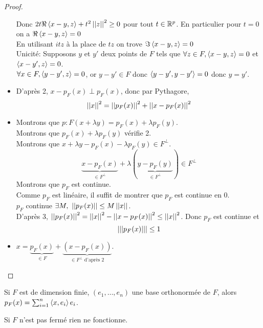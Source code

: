 \begin{proof}
\begin{itemize}
		      Donc $2t\Re \left\langle x - y, z \right\rangle + t^2 \left|\left|z\right|\right|^2 \geq 0$ pour tout $t \in \mathbb{R}^p$.
		      En particulier pour $t = 0$ on a $\Re \left\langle x - y, z \right\rangle = 0$ \\
		      En utilisant $itz$ à la place de $tz$ on trove $\Im \left\langle x - y, z \right\rangle = 0$\\

		      Unicité: Supposons $y$ et $y'$ deux points de $F$ tels que $\forall z \in F, \left\langle x - y, z \right\rangle = 0$ et $\left\langle x - y', z \right\rangle = 0$.\\
		      $\forall x \in F, \left\langle y - y', z \right\rangle = 0$, or $y - y' \in F$ donc $\left\langle y - y', y - y' \right\rangle = 0$ donc $y = y'$.
		\item D'après 2, $x - p_F(x) \perp p_F(x)$, donc par Pythagore,
		      $$ \left|\left|x\right|\right|^2 = \left|\left|p_F(x)\right|\right|^2 + \left|\left|x - p_F(x)\right|\right|^2 $$
		\item Montrons que $p:F( x + \lambda y) = p_F(x) + \lambda p_F(y)$.\\
		      Montrons que $p_F(x) + \lambda p_F(y)$ vérifie 2.\\
		      Montrons que $x + \lambda y - p_F(x) - \lambda p_F(y) \in F^\perp$.\\
		      $$ \underbrace{x - p_F(x)}_{\in F^\perp} + \lambda\left( \underbrace{y - p_F(y)}_{\in F^\perp} \right) \in F^\perp $$
		      Montrons que $p_F$ est continue.\\
		      Comme $p_F$ est linéaire, il suffit de montrer que $p_F$ est continue en 0.\\
		      $p_F$ continue \ssi $\exists M, \ \left|\left|p_F(x)\right|\right| \leq M \left|\left|x\right|\right|$.\\

		      D'après 3, $\left|\left|p_F(x)\right|\right|^2 = \left|\left|x\right|\right|^2 - \left|\left|x - p_F(x)\right|\right|^2 \leq \left|\left|x\right|\right|^2$. Donc $p_F$ est continue et
		      $$\left|\left|\left|p_F(x)\right|\right|\right| \leq 1 $$ %

		\item $x = \underbrace{p_F(x)}_{\in F} + \underbrace{(x - p_F(x))}_{\in F^\perp \text { d'après 2}}$.
	\end{itemize}
\end{proof}

\begin{remarque}
	Si $F$ est de dimension finie, $(e_1, \ldots, e_n)$ une base orthonormée de $F$, alors $p_F(x) = \sum_{i=1}^n \left\langle x, e_i \right\rangle e_i$.
\end{remarque}

\begin{remarque}
	Si $F$ n'est pas fermé rien ne fonctionne.
\end{remarque}

